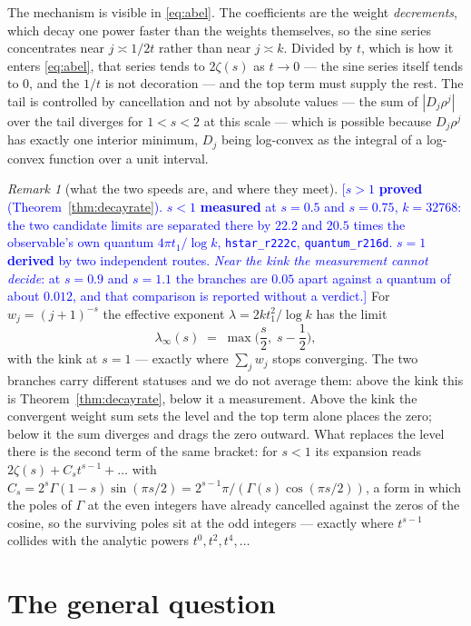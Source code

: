 \documentclass[11pt,a4paper]{article}
\theoremstyle{plain}
\theoremstyle{definition}
\theoremstyle{remark}
\newtheorem{remark}[theorem]{Remark}
\newcommand{\STATUS}[1]{\textcolor{blue}{\textsf{[#1]}}}
\begin{document}
The mechanism is visible in \eqref{eq:abel}. The coefficients are the weight
\emph{decrements}, which decay one power faster than the weights themselves, so the sine
series concentrates near $j\asymp1/2t$ rather than near $j\asymp k$. Divided by $t$, which is
how it enters \eqref{eq:abel}, that series tends to $2\zeta(s)$ as $t\to0$ --- the sine
series itself tends to $0$, and the $1/t$ is not decoration --- and the top term must supply
the rest. The tail is controlled by cancellation and not by
absolute values --- the sum of $|D_j\rho^j|$ over the tail diverges for $1<s<2$ at this scale
--- which is possible because $D_j\rho^j$ has exactly one interior minimum, $D_j$ being
log-convex as the integral of a log-convex function over a unit interval.

\begin{remark}[what the two speeds are, and where they meet]\label{rem:shape}
\STATUS{$s>1$ \textbf{proved} (Theorem~\ref{thm:decayrate}). $s<1$ \textbf{measured} at
$s=0.5$ and $s=0.75$, $k=32768$: the two candidate limits are separated there by $22.2$ and
$20.5$ times the observable's own quantum $4\pi t_1/\log k$, \texttt{hstar\_r222c},
\texttt{quantum\_r216d}. $s=1$ \textbf{derived} by two independent routes. \emph{Near the
kink the measurement cannot decide}: at $s=0.9$ and $s=1.1$ the branches are $0.05$ apart
against a quantum of about $0.012$, and that comparison is reported without a verdict.}
For $w_j=(j+1)^{-s}$ the effective exponent $\lambda=2kt_1^2/\log k$ has the limit
\[
  \lambda_\infty(s)\;=\;\max\Big(\frac{s}{2},\;s-\frac12\Big),
\]
with the kink at $s=1$ --- exactly where $\sum_j w_j$ stops converging. The two branches
carry different statuses and we do not average them: above the kink this is
Theorem~\ref{thm:decayrate}, below it a measurement. Above the kink the convergent weight sum
sets the level and the top term alone places the zero; below it the sum diverges and drags
the zero outward. What replaces the level there is the second term of the same bracket: for
$s<1$ its expansion reads $2\zeta(s)+C_st^{s-1}+\dots$ with
$C_s=2^s\Gamma(1-s)\sin(\pi s/2)=2^{s-1}\pi/(\Gamma(s)\cos(\pi s/2))$, a form in which the
poles of $\Gamma$ at the even integers have already cancelled against the zeros of the
cosine, so the surviving poles sit at the odd integers --- exactly where $t^{s-1}$ collides
with the analytic powers $t^0,t^2,t^4,\dots$
\end{remark}

\section{The general question}\label{sec:general}
\end{document}
